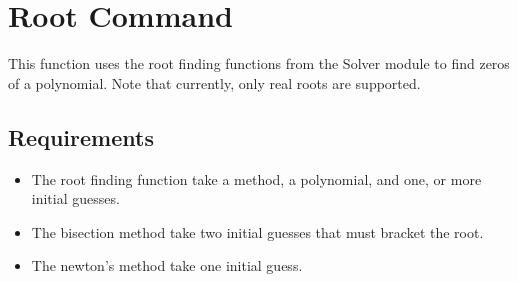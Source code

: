\section{Root Command}
This function uses the root finding functions from the Solver module to find zeros of a polynomial.  Note that currently, only real roots are supported.
\subsection{Requirements}
\begin{itemize}
\item The root finding function  take a method, a polynomial, and one, or more initial guesses.
\item The bisection method  take two initial guesses that must bracket the root.
\item The newton's method  take one initial guess.
\end{itemize}

